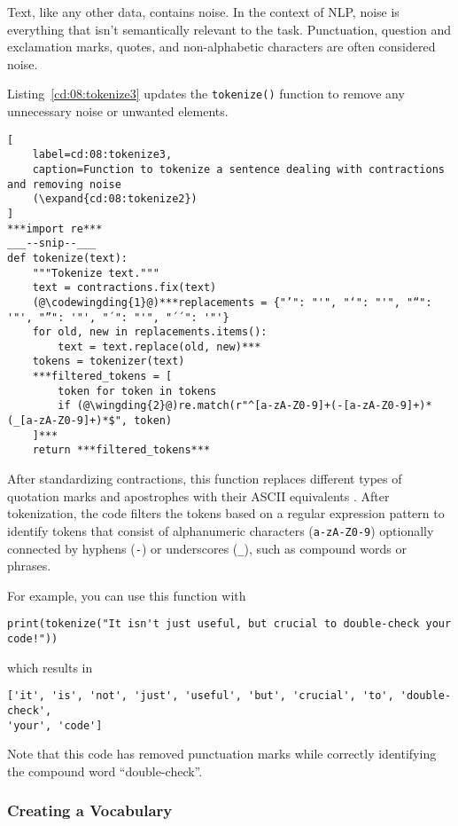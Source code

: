Text, like any other data, contains noise. In the context of NLP, noise is everything that isn't semantically relevant to the task. Punctuation, question and exclamation marks, quotes, and non-alphabetic characters are often considered noise.

Listing~\ref{cd:08:tokenize3} updates the \lstinline{tokenize()} function to remove any unnecessary noise or unwanted elements.
\begin{lstlisting}[
    label=cd:08:tokenize3,
    caption=Function to tokenize a sentence dealing with contractions and removing noise
    (\expand{cd:08:tokenize2})
]
***import re***
___--snip--___
def tokenize(text):
    """Tokenize text."""
    text = contractions.fix(text)
    (@\codewingding{1}@)***replacements = {"’": "'", "‘": "'", "“": '"', "”": '"', "´": "'", "´´": '"'}
    for old, new in replacements.items():
        text = text.replace(old, new)***
    tokens = tokenizer(text)
    ***filtered_tokens = [
        token for token in tokens
        if (@\wingding{2}@)re.match(r"^[a-zA-Z0-9]+(-[a-zA-Z0-9]+)*(_[a-zA-Z0-9]+)*$", token)
    ]***
    return ***filtered_tokens***
\end{lstlisting}
After standardizing contractions, this function replaces different types of quotation marks and apostrophes with their ASCII equivalents . 
After tokenization, the code filters the tokens based on a regular expression pattern  to identify tokens that consist of alphanumeric characters (\lstinline{a-zA-Z0-9}) optionally connected by hyphens (\lstinline{-}) or underscores (\lstinline{_}), such as compound words or phrases.

For example, you can use this function with
\begin{lstlisting}
print(tokenize("It isn't just useful, but crucial to double-check your code!"))
\end{lstlisting}
which results in
\begin{lstlisting}
['it', 'is', 'not', 'just', 'useful', 'but', 'crucial', 'to', 'double-check', 
'your', 'code']
\end{lstlisting}
Note that this code has removed punctuation marks  while correctly identifying the compound word ``double-check''.

\subsubsection{Creating a Vocabulary}

